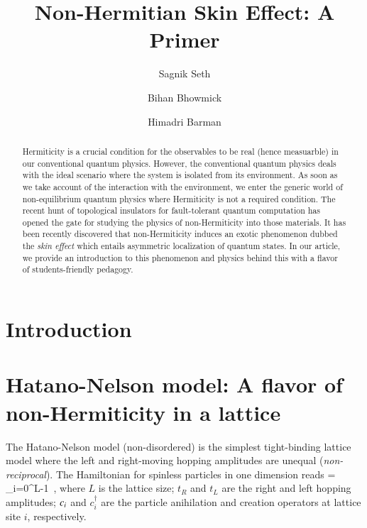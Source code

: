\documentclass[aps,prb,epsf,epsfig,floatfix,showpacs,groupedaddres,superscriptaddress]{revtex4-1}
\numberwithin{equation}{section}
\def\blgn#1\elgn{\begin{align}#1\end{align}}
\newcommand{\y}{^\dag}
\let\py\relax
\providecommand{\py}{^{\phantom \dag}}
\begin{document}
\title{Non-Hermitian Skin Effect: A Primer}
\author{Sagnik Seth}
%
\author{Bihan Bhowmick}
%
%
\author{Himadri Barman}
%
\begin{abstract}
Hermiticity is a crucial condition for the observables to be real (hence measuarble) 
in our conventional quantum physics.
However, the conventional quantum physics deals with the ideal scenario where the system
is isolated from its environment. As soon as we take account of the interaction with the 
environment, we enter the generic world of non-equilibrium quantum physics where Hermiticity
is not a required condition. The recent hunt of topological insulators for fault-tolerant 
quantum computation has opened the gate for studying the physics of non-Hermiticity into
those materials. It has been recently discovered that non-Hermiticity induces an exotic
phenomenon dubbed the \emph{skin effect} which entails asymmetric localization of 
quantum states. In our article, we provide an introduction to this phenomenon and physics
behind this with a flavor of students-friendly pedagogy.    
\end{abstract}
\maketitle

\def\hHN{{\hat H}_{\rm{HN}} }
\def\hSSH{{\hat H}_{\rm{SSH}} }
\def\hNHSSH{{\hat H}_{\rm{NHSSH}} }
\tableofcontents

\newpage
\section{Introduction}

\section{Hatano-Nelson model: A flavor of non-Hermiticity in a lattice}
The Hatano-Nelson model (non-disordered) is the simplest tight-binding
lattice model where the left and right-moving hopping amplitudes are unequal
(\emph{non-reciprocal}). The Hamiltonian for spinless particles in one dimension reads
\blgn
 \hHN = \sum_{i=0}^{L-1} \big[t_R c\y_i c\py_{i+1} + t_L c\y_{i+1} c\py_i \big]\,,   
\elgn
where $L$ is the lattice size; $t_R$ and $t_L$ are the right and left hopping
amplitudes; $c\py_i$ and  $c\y_i$ are the particle anihilation and
creation operators at lattice site $i$, respectively.
\end{document}
